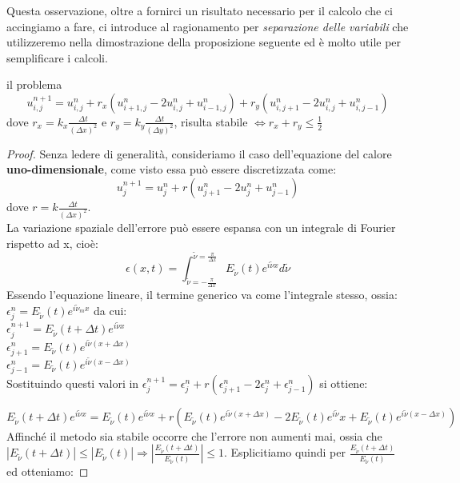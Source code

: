 Questa osservazione, oltre a fornirci un risultato necessario per il calcolo che ci accingiamo a fare, ci introduce al ragionamento per \textit{separazione delle variabili} che utilizzeremo nella dimostrazione della proposizione seguente ed è molto utile per semplificare i calcoli.\\
\begin{proposizione}
il problema
$$
u_{i,j}^{n+1}=u_{i,j}^{n}+r_{x}(u_{i+1,j}^{n}-2u_{i,j}^{n}+u_{i-1,j}^{n})+r_{y}(u_{i,j+1}^{n}-2u_{i,j}^{n}+u_{i,j-1}^{n})
$$
dove $r_x=k_x\frac{\Delta t}{(\Delta x)^2}$ e $r_y=k_y\frac{\Delta t}{(\Delta y)^2}$, risulta stabile $\Leftrightarrow r_x+r_y\leq\frac{1}{2}$ 
\end{proposizione}
\begin{proof}

Senza ledere di generalità, consideriamo il caso dell'equazione del calore \textbf{uno-dimensionale}, come visto essa può essere discretizzata come:
$$
u_{j}^{n+1}=u_{j}^{n}+r(u_{j+1}^{n}-2u_{j}^{n}+u_{j-1}^{n})
$$
dove $r=k \frac{\Delta t}{(\Delta x)^2}$.\\



La variazione spaziale dell'errore può essere espansa con un integrale di Fourier rispetto ad x, cioè:
$$
\epsilon (x,t)=\int _{\tilde{\nu}=-{\frac {\pi }{\Delta x}}}^{\tilde{\nu}={\frac {\pi }{\Delta x}}}E_{\tilde{\nu}}(t)e^{{i}\tilde{\nu}x}d\tilde{\nu}
$$
Essendo l'equazione lineare, il termine generico va come l'integrale stesso, ossia: 
$\epsilon _{j}^{n}=E_{\tilde{\nu}}(t)e^{i\tilde{\nu}_{m}x}$ da cui:\\
\vspace{0.5em}
$\epsilon _{j}^{n+1}=E_{\tilde{\nu}}(t+\Delta t)e^{i\tilde{\nu}x}$\\ 
$\epsilon _{j+1}^{n}=E_{\tilde{\nu}}(t)e^{i\tilde{\nu}(x+\Delta x)}$\\ 
$\epsilon _{j-1}^{n}=E_{\tilde{\nu}}(t)e^{i\tilde{\nu}(x-\Delta x)}$\\
Sostituindo questi valori in $\epsilon_{j}^{n+1}=\epsilon _{j}^{n}+r(\epsilon _{j+1}^{n}-2\epsilon _{j}^{n}+\epsilon _{j-1}^{n})$ si ottiene:

$$
E_{\tilde{\nu}}(t+\Delta t)e^{i\tilde{\nu}x}=E_{\tilde{\nu}}(t)e^{i\tilde{\nu}x}+r(E_{\tilde{\nu}}(t)e^{i\tilde{\nu}(x+\Delta x)}-2E_{\tilde{\nu}}(t)e^{i\tilde{\nu}}x+E_{\tilde{\nu}}(t)e^{i\tilde{\nu}(x-\Delta x)})
$$
Affinché il metodo sia stabile occorre che l'errore non aumenti mai, ossia che\\
\vspace{0.25em}
$|E_{\tilde{\nu}}(t+\Delta t)|\leq |E_{\tilde{\nu}}(t)| \Rightarrow |\frac{E_{\tilde{\nu}}(t+\Delta t)}{E_{\tilde{\nu}}(t)}|\leq 1$. Esplicitiamo quindi per $\frac{E_{\tilde{\nu}}(t+\Delta t)}{E_{\tilde{\nu}}(t)}$ ed otteniamo:


\end{proof}
